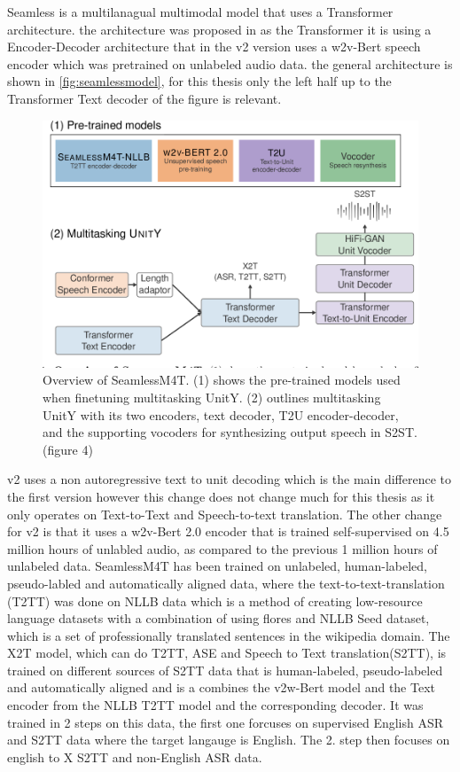 Seamless is a multilanagual multimodal model that uses a Transformer architecture. 
the architecture was proposed in \cite{seamless2023}
as the Transformer it is using a Encoder-Decoder architecture that in the v2 version uses a w2v-Bert speech encoder which was pretrained on unlabeled audio data. 
the general architecture is shown in \autoref{fig:seamlessmodel}, for this thesis only the left half up to the Transformer Text decoder of the figure is relevant. 

\begin{figure}
        \centering%
        \includegraphics[width=0.5\linewidth]{Latex//sections/images/seamlessmodel.png}
        \caption{Overview of SeamlessM4T. (1) shows the pre-trained models used when finetuning multitasking UnitY. (2) outlines multitasking UnitY with its two encoders, text decoder, T2U encoder-decoder, and the supporting vocoders for synthesizing output speech in S2ST. \cite{seamless2023}(figure 4)}
        \label{fig:seamlessmodel}
\end{figure}
    
v2 uses a non autoregressive text to unit decoding which is the main difference to the first version however this change does not change much for this thesis as it only operates on Text-to-Text and Speech-to-text translation. 
The other change for v2 is that it uses a w2v-Bert 2.0 \cite{chung2021w2vbertcombiningcontrastivelearning} encoder that is trained self-supervised on 4.5 million hours of unlabled audio, as compared to the previous 1 million hours of unlabeled data. 
SeamlessM4T has been trained on unlabeled, human-labeled, pseudo-labled and automatically aligned data, where the text-to-text-translation (T2TT) was done on NLLB data \cite{nllbteam2022languageleftbehindscaling}
which is a method of creating low-resource language datasets with a combination of using flores \cite{guzmán2019floresevaluationdatasetslowresource} and NLLB Seed dataset, which is a set of professionally translated sentences in the wikipedia domain. 
The X2T model, which can do T2TT, ASE and Speech to Text translation(S2TT), is trained on different sources of S2TT data that is human-labeled, pseudo-labeled and automatically aligned and is a combines the v2w-Bert model and the Text encoder from the NLLB T2TT model and the corresponding decoder.
It was trained in 2 steps on this data, the first one forcuses on supervised English ASR and S2TT data where the target langauge is English. 
The 2. step then focuses on english to X S2TT and non-English ASR data.


